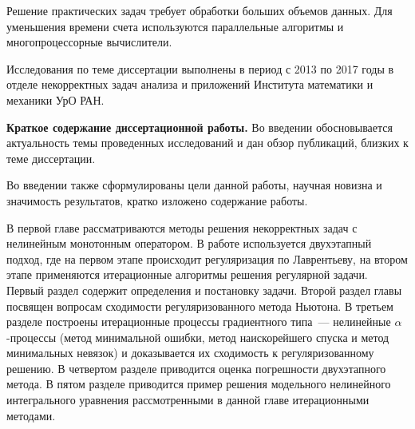 \intro

%
%

\actualitysection
\actualitytext

Решение практических задач требует обработки больших объемов данных. Для уменьшения времени счета используются параллельные алгоритмы и многопроцессорные вычислители.


\developmentsection
\developmenttext

\objectivesection
\objectivetext

\methodssection
\methodstext

\noveltysection
\noveltytext

{}


\approbationsection
\approbationtext

\pubsection
\pubtext

\contribsection
\contribtext

\structsection
\structtext


Исследования по теме диссертации выполнены в период с 2013 по 2017 годы в отделе некорректных задач анализа и приложений Института математики и механики УрО РАН.

\textbf{Краткое содержание диссертационной работы.}
Во введении обосновывается актуальность темы проведенных исследований и дан обзор публикаций, близких к теме диссертации.

Во введении также сформулированы цели данной работы, научная новизна и значимость результатов, кратко изложено содержание работы.

В первой главе рассматриваются методы решения некорректных задач с нелинейным монотонным оператором. В работе используется двухэтапный подход, где на первом этапе происходит регуляризация по Лаврентьеву, на втором этапе применяются итерационные алгоритмы решения регулярной задачи. Первый раздел содержит определения и постановку задачи. Второй раздел главы посвящен вопросам сходимости регуляризованного метода Ньютона. В третьем разделе построены итерационные процессы градиентного типа~--- нелинейные $\alpha$-процессы (метод минимальной ошибки, метод наискорейшего спуска и метод минимальных невязок) и доказывается их сходимость к регуляризованному решению. В четвертом разделе приводится оценка погрешности двухэтапного метода. В пятом разделе приводится пример решения модельного нелинейного интегрального уравнения рассмотренными в данной главе итерационными методами.

